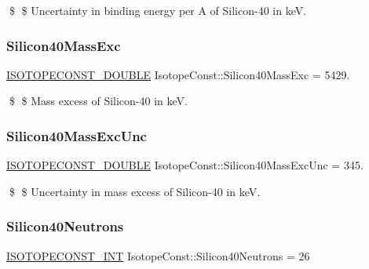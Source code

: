 \$ \$ Uncertainty in binding energy per A of Silicon-\/40 in keV. \mbox{\label{group___isotope_const-_silicon-_si40_ga3dca2a52dee4470a604f76719e16d7bc}} 
\subsubsection{\texorpdfstring{Silicon40\+Mass\+Exc}{Silicon40MassExc}}
{\footnotesize\ttfamily \mbox{\hyperlink{group___isotope_const-_macros_ga8f45a7272ce02c0b4c65c44636ed719a}{I\+S\+O\+T\+O\+P\+E\+C\+O\+N\+S\+T\+\_\+\+D\+O\+U\+B\+LE}} Isotope\+Const\+::\+Silicon40\+Mass\+Exc = 5429.}

\$ \$ Mass excess of Silicon-\/40 in keV. \mbox{\label{group___isotope_const-_silicon-_si40_gabc9b2e88d2085d6639614d778bfac518}} 
\subsubsection{\texorpdfstring{Silicon40\+Mass\+Exc\+Unc}{Silicon40MassExcUnc}}
{\footnotesize\ttfamily \mbox{\hyperlink{group___isotope_const-_macros_ga8f45a7272ce02c0b4c65c44636ed719a}{I\+S\+O\+T\+O\+P\+E\+C\+O\+N\+S\+T\+\_\+\+D\+O\+U\+B\+LE}} Isotope\+Const\+::\+Silicon40\+Mass\+Exc\+Unc = 345.}

\$ \$ Uncertainty in mass excess of Silicon-\/40 in keV. \mbox{\label{group___isotope_const-_silicon-_si40_gad6b21240a79cff24ee2f600ea94b0337}} 
\subsubsection{\texorpdfstring{Silicon40\+Neutrons}{Silicon40Neutrons}}
{\footnotesize\ttfamily \mbox{\hyperlink{group___isotope_const-_macros_ga5f18360b3e99483a35c32d789e62621c}{I\+S\+O\+T\+O\+P\+E\+C\+O\+N\+S\+T\+\_\+\+I\+NT}} Isotope\+Const\+::\+Silicon40\+Neutrons = 26}

